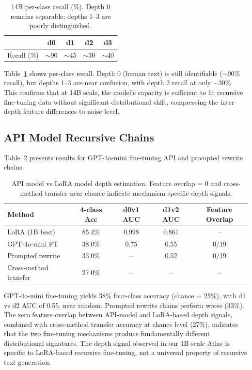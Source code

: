 \documentclass[11pt,a4paper]{article}
\begin{document}
\begin{table}[t]
\centering
\caption{14B per-class recall (\%). Depth 0 remains separable; depths 1--3 are poorly distinguished.}
\label{tab:14b_recall}
\small
\begin{tabular}{lcccc}
\toprule
& \textbf{d0} & \textbf{d1} & \textbf{d2} & \textbf{d3} \\
\midrule
Recall (\%) & ${\sim}$90 & ${\sim}$45 & ${\sim}$30 & ${\sim}$40 \\
\bottomrule
\end{tabular}
\end{table}

Table~\ref{tab:14b_recall} shows per-class recall. Depth 0 (human text) is still identifiable (${\sim}$90\% recall), but depths 1--3 are near confusion, with depth 2 recall at only ${\sim}$30\%. This confirms that at 14B scale, the model's capacity is sufficient to fit recursive fine-tuning data without significant distributional shift, compressing the inter-depth feature differences to noise level.

\subsection{API Model Recursive Chains}

Table~\ref{tab:api} presents results for GPT-4o-mini fine-tuning API and prompted rewrite chains.

\begin{table}[t]
\centering
\caption{API model vs LoRA model depth estimation. Feature overlap = 0 and cross-method transfer near chance indicate mechanism-specific depth signals.}
\label{tab:api}
\small
\begin{tabular}{lcccc}
\toprule
\textbf{Method} & \textbf{4-class Acc} & \textbf{d0v1 AUC} & \textbf{d1v2 AUC} & \textbf{Feature Overlap} \\
\midrule
LoRA (1B best) & 85.4\% & 0.998 & 0.861 & -- \\
GPT-4o-mini FT & 38.0\% & 0.75 & 0.55 & 0/19 \\
Prompted rewrite & 33.0\% & -- & 0.52 & 0/19 \\
Cross-method transfer & 27.0\% & -- & -- & -- \\
\bottomrule
\end{tabular}
\end{table}

GPT-4o-mini fine-tuning yields 38\% four-class accuracy (chance = 25\%), with d1 vs d2 AUC of 0.55, near random. Prompted rewrite chains perform worse (33\%). The zero feature overlap between API-model and LoRA-based depth signals, combined with cross-method transfer accuracy at chance level (27\%), indicates that the two fine-tuning mechanisms produce fundamentally different distributional signatures. The depth signal observed in our 1B-scale Atlas is specific to LoRA-based recursive fine-tuning, not a universal property of recursive text generation.
\end{document}
